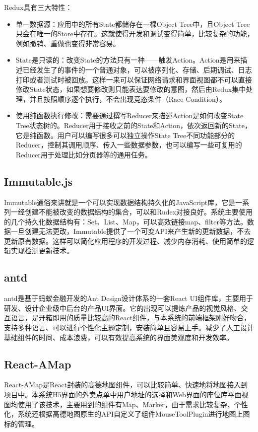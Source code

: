 Redux具有三大特性：
\begin{itemize}
    \item 单一数据源：应用中的所有State都储存在一棵Object Tree中，且Object Tree只会在唯一的Store中存在。这就使得开发和调试变得简单，比较复杂的功能，例如撤销、重做也变得非常容易。
    \item State是只读的：改变State的方法只有一种——触发Action。Action是用来描述已经发生了的事件的一个普通对象，可以被序列化、存储、后期调试、日志打印或者测试时被回放。这样一来可以保证网络请求和界面视图都不可以直接修改State状态，如果想要修改则只能表达要修改的意图，然后由Redux集中处理，并且按照顺序逐个执行，不会出现竞态条件（Race Condition）。
    \item 使用纯函数执行修改：需要通过撰写Reducer来描述Action是如何改变State Tree状态树的。Reducer用于接收之前的State和Action，依次返回新的State，它是纯函数。用户可以编写很多可以独立操作State Tree不同功能部分的Reducer，控制其调用顺序、传入一些数据参数，也可以编写一些可复用的Reducer用于处理比如分页器等的通用任务。\\
\end{itemize}

\subsection{Immutable.js}
Immutable通俗来讲就是一个可以实现数据结构持久化的JavaScript库，它是一系列一经创建不能被改变的数据结构的集合，可以和Rudex对接良好。系统主要使用的几个持久化数据结构有：Set、List、Map，可以高效链接map、filter等方法。数据一旦创建无法更改，Immutable提供了一个可变API来产生新的更新数据，不去更新原有数据。这样可以简化应用程序的开发过程、减少内存消耗、使用简单的逻辑实现检测更新技术。\\

\subsection{antd}
antd是基于蚂蚁金融开发的Ant Design设计体系的一套React UI组件库，主要用于研发、设计企业级中后台的产品UI界面。它的出现可以提炼产品的视觉风格、交互语言，是开箱即用的质量比较高的React组件，与本系统的前端框架刚好吻合，支持多种语言、可以进行个性化主题定制，安装简单且容易上手。减少了人工设计基础组件的时间、成本浪费，可以有效提高系统的界面美观度和开发效率。\\

\subsection{React-AMap}
React-AMap是React封装的高德地图组件，可以比较简单、快速地将地图接入到项目中。本系统H5界面的外卖点单中用户地址的选择和Web界面的座位库平面视图均使用了该技术，主要用到的组件有Map、Marker，由于需求比较复杂、个性化，系统还根据高德地图原生的API自定义了组件MouseToolPlugin进行地图上图标的管理。

